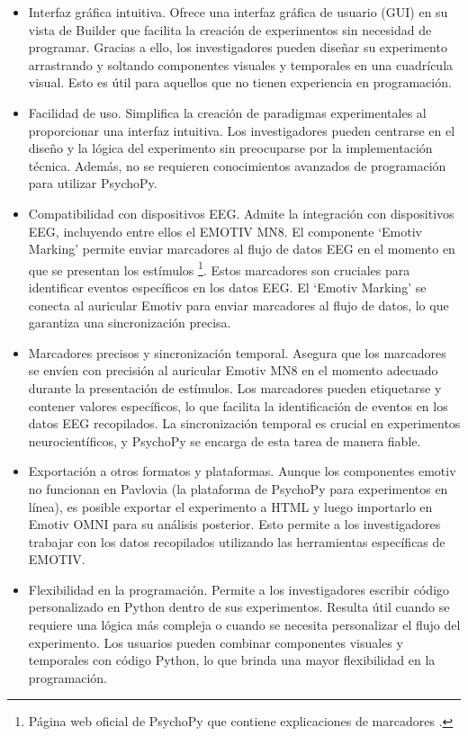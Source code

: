 \begin{itemize}
    \item Interfaz gráfica intuitiva. Ofrece una interfaz gráfica de usuario (GUI) en su vista de Builder que facilita la creación de experimentos sin necesidad de programar. Gracias a ello, los investigadores pueden diseñar su experimento arrastrando y soltando componentes visuales y temporales en una cuadrícula visual. Esto es útil para aquellos que no tienen experiencia en programación.
    \item Facilidad de uso. Simplifica la creación de paradigmas experimentales al proporcionar una interfaz intuitiva. Los investigadores pueden centrarse en el diseño y la lógica del experimento sin preocuparse por la implementación técnica. Además, no se requieren conocimientos avanzados de programación para utilizar PsychoPy.
    \item Compatibilidad con dispositivos EEG. Admite la integración con dispositivos EEG, incluyendo entre ellos el EMOTIV MN8. El componente ‘Emotiv Marking’ permite enviar marcadores al flujo de datos EEG en el momento en que se presentan los estímulos \cite{psychopyEmotivMarking}\footnote{Página web oficial de PsychoPy que contiene explicaciones de marcadores \cite{psychopyEmotivMarking}.}. Estos marcadores son cruciales para identificar eventos específicos en los datos EEG. El ‘Emotiv Marking’ se conecta al auricular Emotiv para enviar marcadores al flujo de datos, lo que garantiza una sincronización precisa.
    \item Marcadores precisos y sincronización temporal. Asegura que los marcadores se envíen con precisión al auricular Emotiv MN8 en el momento adecuado durante la presentación de estímulos. Los marcadores pueden etiquetarse y contener valores específicos, lo que facilita la identificación de eventos en los datos EEG recopilados. La sincronización temporal es crucial en experimentos neurocientíficos, y PsychoPy se encarga de esta tarea de manera fiable.
    \item Exportación a otros formatos y plataformas. Aunque los componentes emotiv no funcionan en Pavlovia (la plataforma de PsychoPy para experimentos en línea), es posible exportar el experimento a HTML y luego importarlo en Emotiv OMNI para su análisis posterior. Esto permite a los investigadores trabajar con los datos recopilados utilizando las herramientas específicas de EMOTIV.
    \item Flexibilidad en la programación. Permite a los investigadores escribir código personalizado en Python dentro de sus experimentos. Resulta útil cuando se requiere una lógica más compleja o cuando se necesita personalizar el flujo del experimento. Los usuarios pueden combinar componentes visuales y temporales con código Python, lo que brinda una mayor flexibilidad en la programación.
\end{itemize}
    
